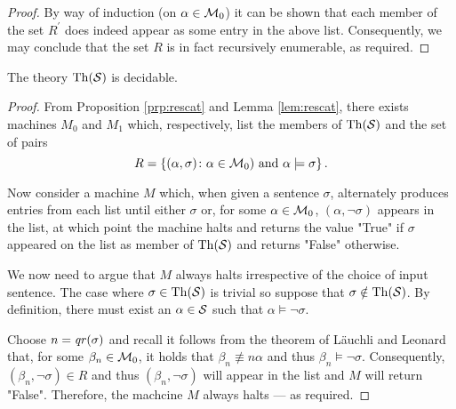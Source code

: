 \begin{proof}
	By way of induction (on $\alpha\in\mathcal{M}_0$) it can be shown that each member of the set $R^\prime$ does indeed appear as some entry in the above list.  Consequently, we may conclude that the set $R$ is in fact recursively enumerable, as required.
\end{proof}

\begin{thm}
	The theory $\operatorname{Th}(\mathcal{S})$ is decidable.
\end{thm}
\begin{proof}
	From Proposition \ref{prp:rescat} and Lemma \ref{lem:rescat}, there exists machines $M_0$ and $M_1$ which, respectively, list the members of $\operatorname{Th}(\mathcal{S})$ and the set of pairs
	\begin{equation}
		R=\left\lbrace (\alpha,\sigma)\colon \alpha\in\mathcal{M}_0)\text{ and }\alpha\models\sigma \right\rbrace.
	\end{equation}

	Now consider a machine $M$ which, when given a sentence $\sigma$, alternately produces entries from each list until either $\sigma$ or, for some $\alpha\in\mathcal{M}_0$, $(\alpha,\neg\sigma)$ appears in the list, at which point the machine halts and returns the value "True" if $\sigma$ appeared on the list as member of $\operatorname{Th}(\mathcal{S})$ and returns "False" otherwise.

	We now need to argue that $M$ always halts irrespective of the choice of input sentence.  The case where $\sigma\in\operatorname{Th}(\mathcal{S})$ is trivial so suppose that $\sigma\notin\operatorname{Th}(\mathcal{S})$.  By definition, there must exist an $\alpha\in\mathcal{S}$ such that $\alpha\models\neg\sigma$.

	Choose $n=\mathit{qr}(\sigma)$ and recall it follows from the theorem of L\"auchli and Leonard that, for some $\beta_n\in\mathcal{M}_0$, it holds that $\beta_n\nequiv{n}\alpha$ and thus $\beta_n\models\neg\sigma$.  Consequently, $(\beta_n,\neg\sigma)\in R$ and thus $(\beta_n,\neg\sigma)$ will appear in the list and $M$ will return "False".  Therefore, the machcine $M$ always halts --- as required.
\end{proof}



